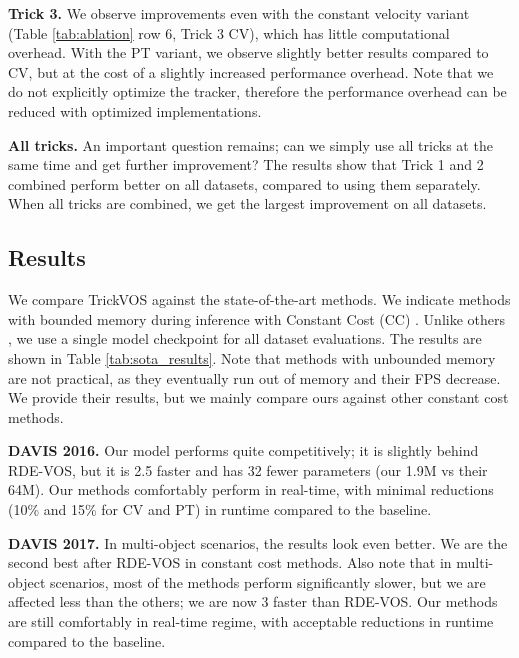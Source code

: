 \noindent \textbf{Trick 3.} We observe improvements even with the constant velocity variant (Table \ref{tab:ablation} row 6, Trick 3 CV), which has little computational overhead. With the PT variant, we observe slightly better results compared to CV, but at the cost of a slightly increased performance overhead. Note that we do not explicitly optimize the tracker, therefore the performance overhead can be reduced with optimized implementations.




\noindent \textbf{All tricks.} An important question remains; can we simply use all tricks at the same time and get further improvement? The results show that Trick 1 and 2 combined perform better on all datasets, compared to using them separately. When all tricks are combined, we get the largest improvement on all datasets. 


\vspace{-5mm}
    
\subsection{Results}
\vspace{-2mm}
\noindent We compare TrickVOS against the state-of-the-art methods. We indicate methods with bounded memory during inference with Constant Cost (CC) \cite{li2022recurrent}. Unlike others \cite{li2022recurrent}, we use a single model checkpoint for all dataset evaluations. The results are shown in Table \ref{tab:sota_results}. Note that methods with unbounded memory are not practical, as they eventually run out of memory and their FPS decrease. We provide their results, but we mainly compare ours against other constant cost methods. 


\noindent \textbf{DAVIS 2016.} Our model performs quite competitively; it is slightly behind RDE-VOS, but it is 2.5 faster and has 32 fewer parameters (our 1.9M vs their 64M). Our methods comfortably perform in real-time, with minimal reductions (10\% and 15\% for CV and PT) in runtime compared to the baseline.



\noindent \textbf{DAVIS 2017.} In multi-object scenarios, the results look even better. We are the second best after RDE-VOS in constant cost methods. Also note that in multi-object scenarios, most of the methods perform significantly slower, but we are affected less than the others; we are now 3 faster than RDE-VOS. Our methods are still comfortably in real-time regime, with acceptable reductions in runtime compared to the baseline.  



